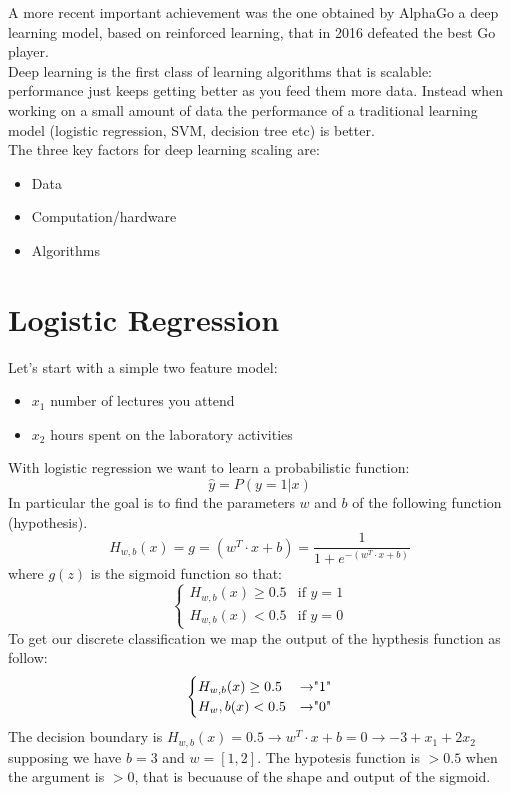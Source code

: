 \documentclass{article}
\begin{document}
A more recent important achievement was the one obtained by AlphaGo a deep learning model, based on reinforced learning, that in 2016 defeated the best Go player.\\
Deep learning is the first class of learning algorithms that is scalable: performance just keeps getting better as you feed them more data. Instead when working on a small amount of data the performance of a traditional learning model (logistic regression, SVM, decision tree etc) is better.\\
The three key factors for deep learning scaling are:
\begin{itemize}
    \item Data
    \item Computation/hardware
    \item Algorithms
\end{itemize}

\section{Logistic Regression}
Let's start with a simple two feature model:
\begin{itemize}
    \item $x_1$ number of lectures you attend
    \item $x_2$ hours spent on the laboratory activities
\end{itemize}
With logistic regression we want to learn a probabilistic function:
$$\hat{y} = P(y=1|x)$$
In particular the goal is to find the parameters $w$ and $b$ of the following function (hypothesis).
$$H_{w,b}(x)= g =(w^T\cdot x+b) = \frac{1}{1+e^{-(w^T\cdot x+b)}}$$
where $g(z)$ is the sigmoid function so that:
$$\begin{cases}
    H_{w,b}(x) \geq 0.5 & \text{if } y=1\\
    H_{w,b}(x)<0.5 & \text{if } y=0
\end{cases}$$
To get our discrete classification we map the output of the hypthesis function as follow:
$$\begin{cases}
    H_{w,b}(x) \geq 0.5 & \text{\textrightarrow "1"}\\
    H_w,b(x)<0.5 & \text{\textrightarrow "0"}
\end{cases}$$
The decision boundary is $H_{w,b}(x) = 0.5 \rightarrow w^T\cdot x+b=0\rightarrow-3+x_1+2x_2$ supposing we have $b=3$ and $w=[1,2]$. The hypotesis function is $>0.5$ when the argument is $>0$, that is becuause of the shape and output of the sigmoid.
\end{document}
